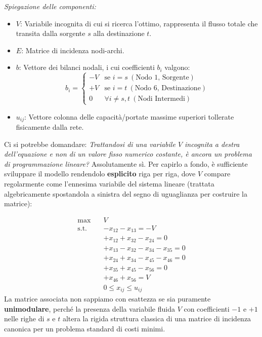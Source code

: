 \documentclass[12pt, a4paper]{article}
\begin{document}
	\textit{Spiegazione delle componenti:}
	\begin{itemize}
		\item $V$: Variabile incognita di cui si ricerca l'ottimo, rappresenta il flusso totale che transita dalla sorgente $s$ alla destinazione $t$.
		\item $E$: Matrice di incidenza nodi-archi.
		\item $b$: Vettore dei bilanci nodali, i cui coefficienti $b_i$ valgono:
		\[
		b_i = 
		\begin{cases}
			-V & \text{se } i = s \ (\text{Nodo 1, Sorgente}) \\
			+V & \text{se } i = t \ (\text{Nodo 6, Destinazione}) \\
			0 & \forall i \neq s, t \ (\text{Nodi Intermedi})
		\end{cases}
		\]
		\item $u_{ij}$: Vettore colonna delle capacità/portate massime superiori tollerate fisicamente dalla rete.
	\end{itemize}
	
	Ci si potrebbe domandare: \textit{Trattandosi di una variabile $V$ incognita a destra dell'equazione e non di un valore fisso numerico costante, è ancora un problema di programmazione lineare?}
	Assolutamente sì. Per capirlo a fondo, è sufficiente sviluppare il modello rendendolo \textbf{esplicito} riga per riga, dove $V$ compare regolarmente come l'ennesima variabile del sistema lineare (trattata algebricamente spostandola a sinistra del segno di uguaglianza per costruire la matrice):
	
	\begin{align*}
		\max \quad & V \\
		\text{s.t.} \quad 
		& -x_{12} - x_{13} = -V \\
		& +x_{12} + x_{32} - x_{24} = 0 \\
		& +x_{13} - x_{32} - x_{34} - x_{35} = 0 \\
		& +x_{24} + x_{34} - x_{45} - x_{46} = 0 \\
		& +x_{35} + x_{45} - x_{56} = 0 \\
		& +x_{46} + x_{56} = V \\
		& 0 \le x_{ij} \le u_{ij}
	\end{align*}
	La matrice associata non sappiamo con esattezza se sia puramente \textbf{unimodulare}, perché la presenza della variabile fluida $V$ con coefficienti $-1$ e $+1$ nelle righe di $s$ e $t$ altera la rigida struttura classica di una matrice di incidenza canonica per un problema standard di costi minimi.
	
\end{document}
